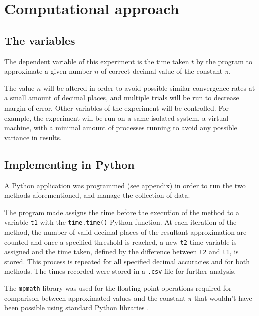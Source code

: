 \section{Computational approach}

\subsection{The variables}
The dependent variable of this experiment is the time taken $t$ by the program 
to approximate a given number $n$ of correct decimal value of the constant $\pi$.

The value $n$ will be altered in order to avoid possible similar convergence rates 
at a small amount of decimal places, and multiple trials will be run to decrease 
margin of error. Other variables of the experiment will be controlled. For example, the experiment 
will be run on a same isolated system, a virtual machine, with a minimal amount of 
processes running to avoid any possible variance in results. 


\subsection{Implementing in Python}

A Python application was programmed (see appendix) in order to run the two 
methods aforementioned, and manage the collection of data. 

The program made assigns the time before the execution of the method to a variable \verb|t1| 
with the \verb|time.time()| Python function. At each iteration of the method, the number of valid decimal 
places of the resultant approximation are counted and once a specified threshold is reached, 
a new \verb|t2| time variable is assigned and the time taken, defined by the difference between 
\verb|t2| and \verb|t1|, is stored. This process is repeated for all specified decimal accuracies and 
for both methods. The times recorded were stored in a \verb|.csv| file for further analysis. 

The \verb|mpmath| library was used for the floating point operations required 
for comparison between approximated values and the constant $\pi$ that wouldn't 
have been possible using standard Python libraries \cite{mpmath}. 